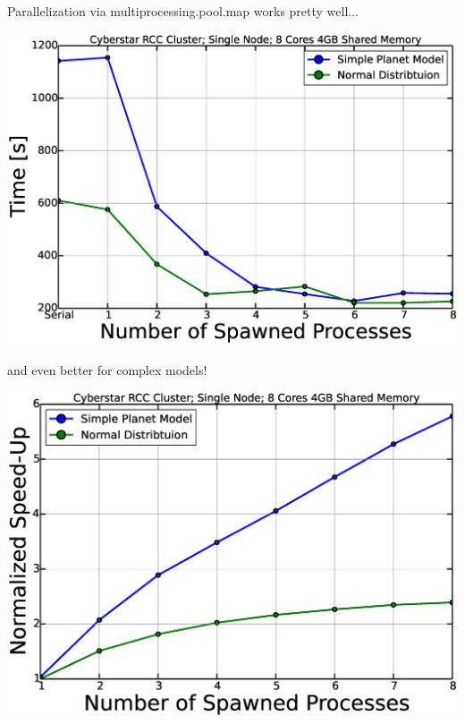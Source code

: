 \documentclass{beamer}
\begin{document}
\begin{frame}{Parallelization via multiprocessing.pool.map works pretty well...}
\begin{center}
\includegraphics[scale=.3]{time.eps}
\end{center}
\end{frame}

\begin{frame}{and even better for complex models!}
\begin{center}
\includegraphics[scale=.3]{speedup.eps}
\end{center}
\end{frame}
\end{document}
